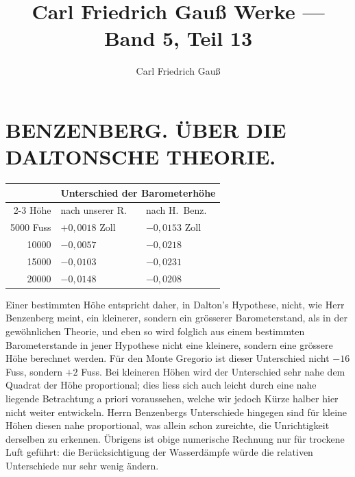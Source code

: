 \documentclass[fontsize=10pt,paper=a5,pagesize=auto]{scrbook}
\title{Carl Friedrich Gauß Werke --- Band 5, Teil 13}
\author{Carl Friedrich Gauß}
\date{}
\newcommand{\origpage}[1]{\marginpar{\footnotesize\textit{S. #1}}}
\begin{document}
\frontmatter
\maketitle

\mainmatter

\section*{BENZENBERG. ÜBER DIE DALTONSCHE THEORIE.}
\label{sec:benzenberg}

\origpage{589}
\begin{table}[htbp]
\centering
\small
\begin{tabular}{@{}rll@{}}
\toprule
& \multicolumn{2}{c}{Unterschied der Barometerhöhe} \\
\cmidrule{2-3}
Höhe & nach unserer R. & nach H.~Benz. \\
\midrule
\phantom{0}5000 Fuss & $+0{,}0018$ Zoll & $-0{,}0153$ Zoll \\
10000 & $-0{,}0057$ & $-0{,}0218$ \\
15000 & $-0{,}0103$ & $-0{,}0231$ \\
20000 & $-0{,}0148$ & $-0{,}0208$ \\
\bottomrule
\end{tabular}
\end{table}

Einer bestimmten Höhe entspricht daher, in Dalton's Hypothese, nicht, wie Herr Benzenberg meint, ein kleinerer, sondern ein grösserer Barometerstand, als in der gewöhnlichen Theorie, und eben so wird folglich aus einem bestimmten Barometerstande in jener Hypothese nicht eine kleinere, sondern eine grössere Höhe berechnet werden. Für den Monte Gregorio ist dieser Unterschied nicht $-16$ Fuss, sondern $+2$ Fuss. Bei kleineren Höhen wird der Unterschied sehr nahe dem Quadrat der Höhe proportional; dies liess sich auch leicht durch eine nahe liegende Betrachtung a priori voraussehen, welche wir jedoch Kürze halber hier nicht weiter entwickeln. Herrn Benzenbergs Unterschiede hingegen sind für kleine Höhen diesen nahe proportional, was allein schon zureichte, die Unrichtigkeit derselben zu erkennen. Übrigens ist obige numerische Rechnung nur für trockene Luft geführt: die Berücksichtigung der Wasserdämpfe würde die relativen Unterschiede nur sehr wenig ändern.
\end{document}

